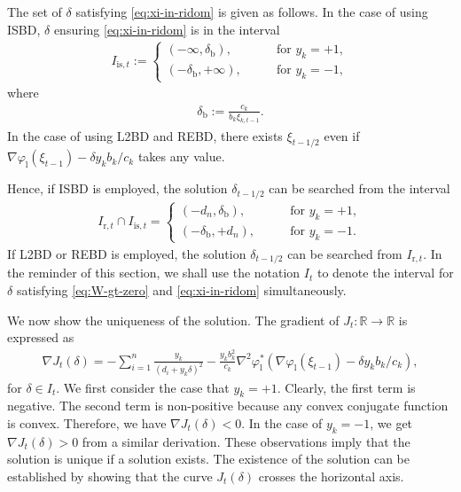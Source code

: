 \documentclass[10pt,onecolumn]{article}
\theoremstyle{definition}
\theoremstyle{definition}
\theoremstyle{definition}
\theoremstyle{definition}
\theoremstyle{definition}
\theoremstyle{theorem}
\newcommand{\0}{{\bm{0}}}
\newcommand{\1}{{\bm{1}}}
\newcommand{\bR}{{\mathbb{R}}}
\begin{document}
The set of $\delta$ satisfying \eqref{eq:xi-in-ridom} is given
as follows.  In the case of using ISBD,
$\delta$ ensuring \eqref{eq:xi-in-ridom} is in
the interval
%
\begin{align*}
I_{\text{is},t} :=
\begin{cases}
( -\infty, \delta_{\text{b}} ), &\qquad \text{for $y_{k}=+1$},
\\
( -\delta_{\text{b}}, +\infty ), &\qquad \text{for $y_{k}=-1$},
\end{cases}
\end{align*}
where
\begin{align*}
  \delta_{\text{b}} := \frac{c_{k}}{b_{k}\xi_{k,t-1}}.
\end{align*}
In the case of using L2BD and REBD, there exists $\xi_{t-1/2}$ even if
$\nabla\varphi_{\text{l}}(\xi_{t-1}) - \delta y_{k}b_{k}/c_{k}$ takes any value.

Hence, if ISBD is employed, the solution $\delta_{t-1/2}$ can be searched
from the interval
\begin{align*}
  I_{\text{r},t}\cap I_{\text{is},t} =
\begin{cases}
( -d_{n}, \delta_{\text{b}} ), &\qquad \text{for $y_{k}=+1$},
\\
( -\delta_{\text{b}}, +d_{n} ), &\qquad \text{for $y_{k}=-1$}.
\end{cases}
\end{align*}
If L2BD or REBD is employed,
the solution $\delta_{t-1/2}$ can be searched from $I_{\text{r},t}$.
In the reminder of this section, we shall use the notation $I_{t}$ to
denote the interval for $\delta$ satisfying \eqref{eq:W-gt-zero}
and \eqref{eq:xi-in-ridom} simultaneously.

We now show the uniqueness of the solution. The gradient of $J_{t}:\bR\to\bR$
is expressed as
%
\begin{align*}
  \nabla J_{t}(\delta)
  =
  -\sum_{i=1}^{n}\frac{y_{k}}{(d_{i}+y_{k}\delta)^{2}}
  -\frac{y_{k}b_{k}^{2}}{c_{k}}
  \nabla^{2}\varphi^{*}_{\text{l}}
  (\nabla\varphi_{\text{l}}(\xi_{t-1}) - \delta y_{k}b_{k}/c_{k}),
\end{align*}
%
for $\delta\in I_{t}$.  We first consider the case that
$y_{k}=+1$. Clearly, the first term is negative.
The second term is non-positive because any convex conjugate function
is convex. Therefore, we have $\nabla J_{t}(\delta) < 0$.
In the case of $y_{k}=-1$,
we get $\nabla J_{t}(\delta) > 0$ from a similar derivation.
These observations imply that the solution is unique
if a solution exists.  The existence of the solution can be
established by showing that the curve $J_{t}(\delta)$ crosses
the horizontal axis.
\end{document}
